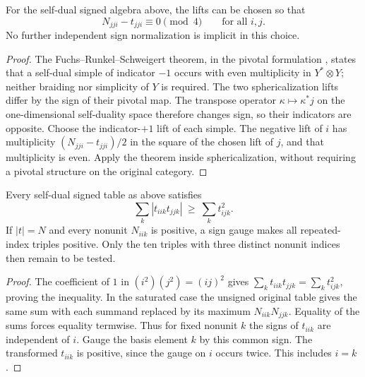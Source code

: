 \begin{lemma}\label{lem:m9-indicator-gauge}
For the self-dual signed algebra above, the lifts can be chosen so that
\[
 N_{jji}-t_{jji}\equiv0\pmod4\qquad\text{for all }i,j.
\]
No further independent sign normalization is implicit in this choice.
\end{lemma}
\begin{proof}
The Fuchs--Runkel--Schweigert theorem, in the pivotal formulation
\cite[Theorem~3.9]{LPRV2025}, states that a self-dual simple of indicator
$-1$ occurs with even multiplicity in $Y^*\otimes Y$; neither braiding
nor simplicity of $Y$ is required. The two sphericalization lifts differ
by the sign of their pivotal map. The transpose operator
$\kappa\mapsto\kappa^*j$ on the one-dimensional self-duality space
therefore changes sign, so their indicators are opposite. Choose the
indicator-$+1$ lift of each simple. The negative lift of $i$ has
multiplicity $(N_{jji}-t_{jji})/2$ in the square of the chosen lift of $j$,
and that multiplicity is even. Apply the theorem inside sphericalization,
without requiring a pivotal structure on the original category.
\end{proof}

\begin{lemma}
\label{lem:m9-diagonal}
Every self-dual signed table as above satisfies
\[
 \sum_k |t_{iik}t_{jjk}|\ \geq\ \sum_k t_{ijk}^2.
 \tag{$\dagger$}
\]
If $|t|=N$ and every nonunit $N_{iik}$ is positive, a sign gauge makes
all repeated-index triples positive. Only the ten triples with three
distinct nonunit indices then remain to be tested.
\end{lemma}
\begin{proof}
The coefficient of $1$ in $(i^2)(j^2)=(ij)^2$ gives
$\sum_k t_{iik}t_{jjk}=\sum_k t_{ijk}^2$, proving the inequality.
In the saturated case the unsigned original table gives the same sum
with each summand replaced by its maximum $N_{iik}N_{jjk}$. Equality of
the sums forces equality termwise. Thus for fixed nonunit $k$ the signs
of $t_{iik}$ are independent of $i$. Gauge the basis element $k$ by this
common sign. The transformed $t_{iik}$ is positive, since the gauge on
$i$ occurs twice. This includes $i=k$.
\end{proof}

